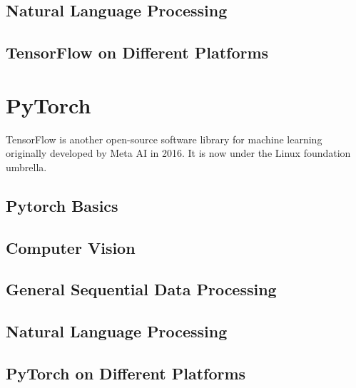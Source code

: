 \subsection{Natural Language Processing}


\subsection{TensorFlow on Different Platforms}

\section{PyTorch}

TensorFlow is another open-source software library for machine learning originally developed by Meta AI in 2016. It is now under the Linux foundation umbrella.

\subsection{Pytorch Basics}

\subsection{Computer Vision}

\subsection{General Sequential Data Processing}

\subsection{Natural Language Processing}

\subsection{PyTorch on Different Platforms}

